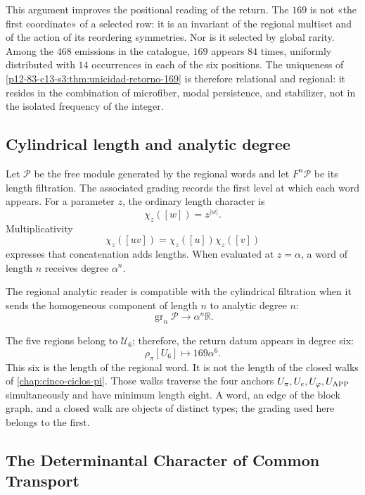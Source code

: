 This argument improves the positional reading of the return. The \(169\) is not
«the first coordinate» of a selected row: it is an invariant of the
regional multiset and of the action of its reordering symmetries.
Nor is it selected by global rarity. Among the \(468\) emissions in the
catalogue, \(169\) appears \(84\) times, uniformly distributed with
\(14\) occurrences in each of the six positions. The uniqueness of
\cref{p12-83-c13-s3:thm:unicidad-retorno-169} is therefore relational and regional: it resides
in the combination of microfiber, modal persistence, and stabilizer, not in the
isolated frequency of the integer.

\subsection{Cylindrical length and analytic degree}

Let \(\mathcal P\) be the free module generated by the regional words and
let \(F^n\mathcal P\) be its length filtration. The associated grading
records the first level at which each word appears. For a parameter
\(z\), the ordinary length character is
\[
\chi_z([w])=z^{|w|}.
\]
Multiplicativity
\[
\chi_z([uv])=\chi_z([u])\chi_z([v])
\]
expresses that concatenation adds lengths. When evaluated at
\(z=\alpha\), a word of length \(n\) receives degree \(\alpha^n\).

\begin{definition}
\label{p12-83-c13-s3:def:compatibilidad-grado}
The regional analytic reader is compatible with the cylindrical filtration
when it sends the homogeneous component of length \(n\) to analytic degree
\(n\):
\[
\operatorname{gr}_n\mathcal P\longrightarrow
\alpha^n\mathbb R.
\]
\end{definition}

The five regions belong to \(\mathcal U_6\); therefore, the return datum
appears in degree six:
\[
\rho_\pi[U_6]\longmapsto169\alpha^6.
\]
This six is the length of the regional word. It is not the length of the
closed walks of \cref{chap:cinco-ciclos-pi}. Those walks traverse
the four anchors
\(U_\pi,U_e,U_\varphi,U_{\rm APP}\) simultaneously and have minimum length eight. A
word, an edge of the block graph, and a closed walk are objects of
distinct types; the grading used here belongs to the first.

\subsection{The Determinantal Character of Common Transport}

